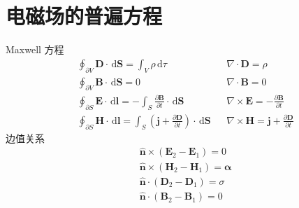 \documentclass[12pt,a4paper]{article}%
\numberwithin{equation}{section}%
\renewcommand*{\vec}[1]{\bm{#1}}%
\newcommand{\dif}{\,\mathrm d}
\newcommand*{\uvec}[1]{\hat{\vec{#1}}}
\begin{document}
\section{电磁场的普遍方程} %
\label{sec:general_equ_for_EMF}
Maxwell 方程
\begin{align}
    &\oint_{\partial V}\vec D\cdot \dif \vec S = \int_V \rho \dif \tau &
    &\nabla\cdot\vec D = \rho \\
    &\oint_{\partial V} \vec B\cdot \dif \vec S = 0 &
    &\nabla\cdot\vec B = 0 \\
    &\oint_{\partial S}\vec E\cdot\dif\vec l = -\int_S\frac{\partial \vec B}{\partial t}\cdot\dif\vec S &
    &\nabla\times\vec E = -\frac{\partial \vec B}{\partial t} \\
    &\oint_{\partial S}\vec H\cdot\dif\vec l = \int_S\left(\vec j + \frac{\partial\vec D}{\partial t}\right)\cdot\dif\vec S &
    &\nabla\times\vec H = \vec j + \frac{\partial\vec D}{\partial t}
\end{align} 
边值关系
\begin{align}
    &\uvec n\times(\vec E_2 -\vec E_1) = 0 \\
    &\uvec n\times(\vec H_2 - \vec H_1) = \vec\alpha \\
    &\uvec n\cdot(\vec D_2 - \vec D_1) = \sigma \\
    &\uvec n \cdot(\vec B_2 - \vec B_1) = 0
\end{align}
\end{document}
